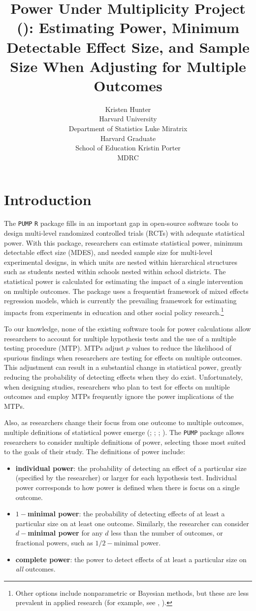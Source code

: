 \documentclass[
]{jss}
\author{
Kristen Hunter \orcidlink{0000-0002-5678-4620}\\Harvard University\\
Department of Statistics \And Luke Miratrix\\Harvard Graduate\\
School of Education \And Kristin Porter\\MDRC
}
\title{Power Under Multiplicity Project (\pkg{PUMP}): Estimating Power,
Minimum Detectable Effect Size, and Sample Size When Adjusting for
Multiple Outcomes}
\providecommand{\tightlist}{%
  \setlength{\itemsep}{0pt}\setlength{\parskip}{0pt}}
\begin{document}
\section{Introduction}
\label{sec:intro}

The \texttt{PUMP} \texttt{R} package fills in an important gap in
open-source software tools to design multi-level randomized controlled
trials (RCTs) with adequate statistical power. With this package,
researchers can estimate statistical power, minimum detectable effect
size (MDES), and needed sample size for multi-level experimental
designs, in which units are nested within hierarchical structures such
as students nested within schools nested within school districts. The
statistical power is calculated for estimating the impact of a single
intervention on multiple outcomes. The package uses a frequentist
framework of mixed effects regression models, which is currently the
prevailing framework for estimating impacts from experiments in
education and other social policy research.\footnote{Other options
  include nonparametric or Bayesian methods, but these are less
  prevalent in applied research (for example, see
  \citet{GELMANETAL2012}, \citet{GelmanHill2007}).}

To our knowledge, none of the existing software tools for power
calculations allow researchers to account for multiple hypothesis tests
and the use of a multiple testing procedure (MTP). MTPs adjust \(p\)
values to reduce the likelihood of spurious findings when researchers
are testing for effects on multiple outcomes. This adjustment can result
in a substantial change in statistical power, greatly reducing the
probability of detecting effects when they do exist. Unfortunately, when
designing studies, researchers who plan to test for effects on multiple
outcomes and employ MTPs frequently ignore the power implications of the
MTPs.

Also, as researchers change their focus from one outcome to multiple
outcomes, multiple definitions of statistical power emerge
(\citet{RN23882}; \citet{RN23878}; \citet{RN23881}; \citet{MTSAS}). The
\texttt{PUMP} package allows researchers to consider multiple
definitions of power, selecting those most suited to the goals of their
study. The definitions of power include:

\begin{itemize}
\tightlist
\item
  \textbf{individual power}: the probability of detecting an effect of a
  particular size (specified by the researcher) or larger for each
  hypothesis test. Individual power corresponds to how power is defined
  when there is focus on a single outcome.
\item
  \textbf{\(1-\)minimal power}: the probability of detecting effects of
  at least a particular size on at least one outcome. Similarly, the
  researcher can consider \textbf{\(d-\)minimal power} for any \(d\)
  less than the number of outcomes, or fractional powers, such as
  \(1/2-\)minimal power.
\item
  \textbf{complete power}: the power to detect effects of at least a
  particular size on \emph{all} outcomes.
\end{itemize}
\end{document}
